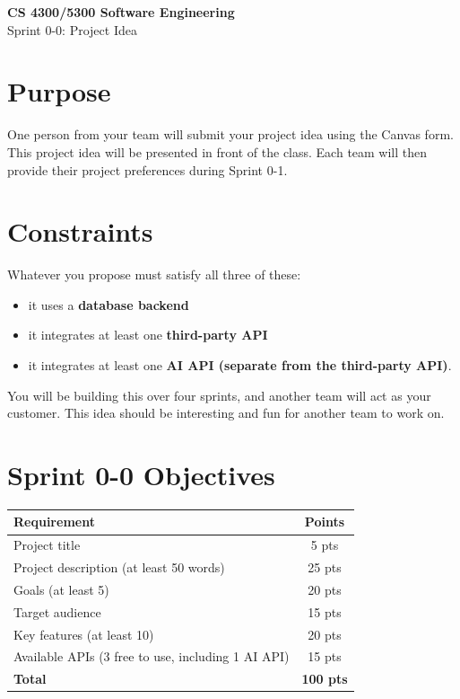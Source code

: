 \documentclass[11pt]{article}
\begin{document}
\begin{center}
{\LARGE\textbf{CS 4300/5300 Software Engineering}}\\[0.5em]
{\Large Sprint 0-0: Project Idea}\\[1em]
\end{center}

\section{Purpose}

One person from your team will submit your project idea using the Canvas form. This project idea will be presented in front of the class. Each team will then provide their project preferences during Sprint 0-1.

\section{Constraints}

Whatever you propose must satisfy all three of these:
\begin{itemize}
    \item it uses a \textbf{database backend}
    \item it integrates at least one \textbf{third-party API}
    \item it integrates at least one \textbf{AI API (separate from the third-party API)}.
\end{itemize}

You will be building this over four sprints, and another team will act as your customer. This idea should be interesting and fun for another team to work on.

\section{Sprint 0-0 Objectives}

\begin{center}
\begin{tabular}{lc}
\toprule
\textbf{Requirement} & \textbf{Points} \\
\midrule
Project title & 5 pts \\
Project description (at least 50 words) & 25 pts \\
Goals (at least 5) & 20 pts \\
Target audience & 15 pts \\
Key features (at least 10) & 20 pts \\
Available APIs (3 free to use, including 1 AI API) & 15 pts \\
\midrule
\textbf{Total} & \textbf{100 pts} \\
\bottomrule
\end{tabular}
\end{center}
\end{document}
